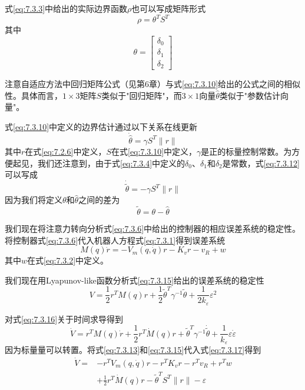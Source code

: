 \documentclass[UTF8]{ctexart}
\begin{document}
式\eqref{eq:7.3.3}中给出的实际边界函数$\rho$也可以写成矩阵形式
\begin{equation}\label{eq:7.3.11}
\rho = \theta^T S^T
\end{equation}
其中
\begin{equation*}
\theta = \begin{bmatrix} \delta_0 \\ \delta_1 \\ \delta_2 \end{bmatrix}
\end{equation*}

注意自适应方法中回归矩阵公式（见第6章）与式\eqref{eq:7.3.10}给出的公式之间的相似性。具体而言，$1 \times 3$矩阵$S$类似于"回归矩阵"，而$3 \times 1$向量$\hat{\theta}$类似于"参数估计向量"。

式\eqref{eq:7.3.10}中定义的边界估计通过以下关系在线更新
\begin{equation}\label{eq:7.3.12}
\dot{\hat{\theta}} = \gamma S^T\|r\|
\end{equation}
其中$r$在式\eqref{eq:7.2.6}中定义，$S$在式\eqref{eq:7.3.10}中定义，$\gamma$是正的标量控制常数。为方便起见，我们还注意到，由于式\eqref{eq:7.3.4}中定义的$\delta_0$、$\delta_1$和$\delta_2$是常数，式\eqref{eq:7.3.12}可以写成
\begin{equation}\label{eq:7.3.13}
\dot{\tilde{\theta}} = -\gamma S^T\|r\|
\end{equation}
因为我们将定义$\theta$和$\hat{\theta}$之间的差为
\begin{equation}\label{eq:7.3.14}
\tilde{\theta} = \theta - \hat{\theta}
\end{equation}

我们现在将注意力转向分析式\eqref{eq:7.3.6}中给出的控制器的相应误差系统的稳定性。将控制器式\eqref{eq:7.3.6}代入机器人方程式\eqref{eq:7.3.1}得到误差系统
\begin{equation}\label{eq:7.3.15}
M(q)\dot{r} = -V_m(q,\dot{q})r - K_v r - v_R + w
\end{equation}
其中$w$在式\eqref{eq:7.3.2}中定义。

我们现在用Lyapunov-like函数分析式\eqref{eq:7.3.15}给出的误差系统的稳定性
\begin{equation}\label{eq:7.3.16}
V = \frac{1}{2}r^T M(q)r + \frac{1}{2}\tilde{\theta}^T \gamma^{-1}\tilde{\theta} + \frac{1}{2k_\varepsilon}\varepsilon^2
\end{equation}

对式\eqref{eq:7.3.16}关于时间求导得到
\begin{equation}\label{eq:7.3.17}
\dot{V} = r^T M(q)\dot{r} + \frac{1}{2}r^T\dot{M}(q)r + \tilde{\theta}^T\gamma^{-1}\dot{\tilde{\theta}} + \frac{1}{k_\varepsilon}\varepsilon\dot{\varepsilon}
\end{equation}
因为标量量可以转置。将式\eqref{eq:7.3.13}和\eqref{eq:7.3.15}代入式\eqref{eq:7.3.17}得到
\begin{equation}\label{eq:7.3.18}
\begin{aligned}
\dot{V} = & -r^T V_m(q,\dot{q})r - r^T K_v r - r^T v_R + r^T w \\
& + \frac{1}{2}r^T\dot{M}(q)r - \tilde{\theta}^T S^T\|r\| - \varepsilon
\end{aligned}
\end{equation}
\end{document}

